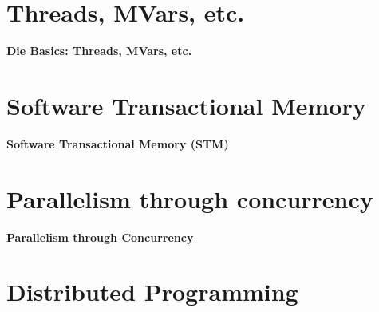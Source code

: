 \documentclass{beamer}
\begin{document}


\section{Threads, MVars, etc.}

\begin{frame}

\begin{center}
\Large
\textbf{Die Basics: Threads, MVars, etc.}
\end{center}

\end{frame}


\section{Software Transactional Memory}

\begin{frame}

\begin{center}
\Large
\textbf{Software Transactional Memory (STM)}
\end{center}

\end{frame}


\section{Parallelism through concurrency}

\begin{frame}

\begin{center}
\Large
\textbf{Parallelism through Concurrency}
\end{center}

\end{frame}


\section{Distributed Programming}

\begin{frame}

\begin{center}
\Large
\textbf{Distributed Programming
\end{center}

\end{frame}
\end{document}
